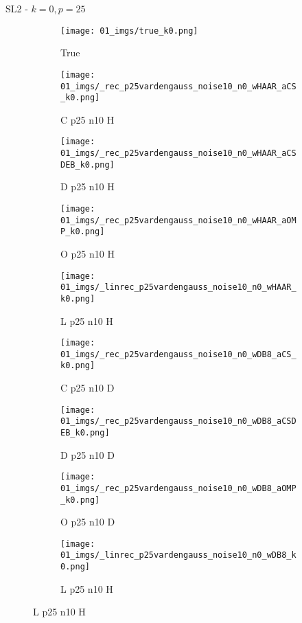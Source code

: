 \begin{frame}{SL2 - $k=0,p=25$}{}
\begin{figure}
\begin{subfigure}{0.1\textwidth}
\texttt{[image: 01\_imgs/true\_k0.png]}
\caption*{\Tiny True}
\end{subfigure}
\begin{subfigure}{0.1\textwidth}
\texttt{[image: 01\_imgs/\_rec\_p25vardengauss\_noise10\_n0\_wHAAR\_aCS\_k0.png]}
\caption*{\Tiny C p25 n10 H}
\end{subfigure}
\begin{subfigure}{0.1\textwidth}
\texttt{[image: 01\_imgs/\_rec\_p25vardengauss\_noise10\_n0\_wHAAR\_aCSDEB\_k0.png]}
\caption*{\Tiny D p25 n10 H}
\end{subfigure}
\begin{subfigure}{0.1\textwidth}
\texttt{[image: 01\_imgs/\_rec\_p25vardengauss\_noise10\_n0\_wHAAR\_aOMP\_k0.png]}
\caption*{\Tiny O p25 n10 H}
\end{subfigure}
\begin{subfigure}{0.1\textwidth}
\texttt{[image: 01\_imgs/\_linrec\_p25vardengauss\_noise10\_n0\_wHAAR\_k0.png]}
\caption*{\Tiny L p25 n10 H}
\end{subfigure}
\begin{subfigure}{0.1\textwidth}
\texttt{[image: 01\_imgs/\_rec\_p25vardengauss\_noise10\_n0\_wDB8\_aCS\_k0.png]}
\caption*{\Tiny C p25 n10 D}
\end{subfigure}
\begin{subfigure}{0.1\textwidth}
\texttt{[image: 01\_imgs/\_rec\_p25vardengauss\_noise10\_n0\_wDB8\_aCSDEB\_k0.png]}
\caption*{\Tiny D p25 n10 D}
\end{subfigure}
\begin{subfigure}{0.1\textwidth}
\texttt{[image: 01\_imgs/\_rec\_p25vardengauss\_noise10\_n0\_wDB8\_aOMP\_k0.png]}
\caption*{\Tiny O p25 n10 D}
\end{subfigure}
\begin{subfigure}{0.1\textwidth}
\texttt{[image: 01\_imgs/\_linrec\_p25vardengauss\_noise10\_n0\_wDB8\_k0.png]}
\caption*{\Tiny L p25 n10 H}
\end{subfigure}

\vspace{5pt}


\end{figure}
\end{frame}
